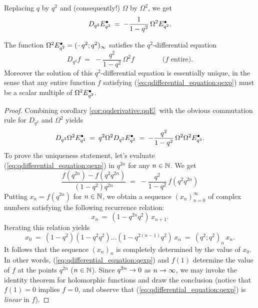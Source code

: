 \begin{cor} \label{cor:qqderivative:qqE}
Replacing $q$ by $q^2$ and (consequently!) $\Omega$ by $\Omega^2$, we get
$$  D_{q^2} E_{q^2}^\bullet \:=\: -\frac{1}{1-q^2}\, \Omega^2 E_{q^2}^\bullet. $$
\end{cor}

\begin{prop} \label{prop:qdifferential_equation:qexp}
The function $\Omega^2 E_{q^2}^\bullet = (\,\cdot\,q^2 ;q^2)_\infty$ satisfies the
$q^2$-differential equation
\begin{equation}\label{eq:qdifferential_equation:qexp}
   D_{q^2} f \;=\; -\frac{q^2}{1-q^2}\, \Omega^2 f
     \hspace{4em} \mbox{($f$ entire).}
\end{equation}
Moreover the solution of this $q^2$-differential equation is
essentially unique, in the sense that any entire function $f$
satisfying (\ref{eq:qdifferential_equation:qexp}) must be a scalar
multiple of\/ $\Omega^2 E_{q^2}^\bullet$.
\end{prop}
\begin{proof}
Combining corollary \ref{cor:qqderivative:qqE}\ with the obvious
commutation rule for $D_{q^2}$ and $\Omega^2$ yields
$$ D_{q^2} \Omega^2 E_{q^2}^\bullet \:=\: q^2 \Omega^2 D_{q^2} E_{q^2}^\bullet
             \:=\: -\frac{q^2}{1-q^2}\, \Omega^2 \Omega^2 E_{q^2}^\bullet. $$
To prove the uniqueness statement, let's evaluate (\ref{eq:qdifferential_equation:qexp})
in $q^{2n}$ for any $n\in\mathbb{N}$. We get
$$ \frac{f(q^{2n})-f(q^2 q^{2n})}{(1-q^2) q^{2n}}
            \;=\;  -\frac{q^2}{1-q^2}\, f(q^2 q^{2n}) $$
Putting $x_n = f(q^{2n})$ for $n\in\mathbb{N}$, we obtain a sequence $(x_n)_{n=0}^\infty$
of complex numbers satisfying the following recurrence relation:
$$ x_n \,=\: (1-q^{2n} q^2)\, x_{n+1}. $$
Iterating this relation yields
\begin{equation}\label{eq:uniqueness:recurrence_relation}
   x_0 \:=\: (1-q^2)(1-q^2 q^2) \ldots (1-q^{2(n-1)} q^2) \, x_n
       \:=\: (q^2;q^2)_n \, x_n.
\end{equation}
It follows that the sequence $(x_n)_n$ is completely determined by
the value of $x_0$. In other words, (\ref{eq:qdifferential_equation:qexp}) and
$f(1)$ determine the value of $f$ at the points $q^{2n}$ ($n\in\mathbb{N}$).
Since $q^{2n} \rightarrow 0$ as $n\rightarrow\infty$, we may invoke the identity theorem
for holomorphic functions and draw the conclusion (notice that $f(1)=0$ implies $f=0$,
and observe that (\ref{eq:qdifferential_equation:qexp}) is {\em linear\/} in $f$).
\end{proof}

